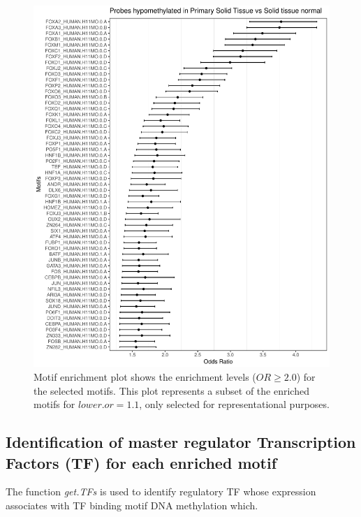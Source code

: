 

\begin{figure}[ht!]
\centering
\includegraphics[width=1.0\textwidth]{images/OR_nosummary.pdf}
\caption[Motif enrichment plot]{\label{fig:boxplot2} Motif enrichment plot shows the enrichment levels ($OR\geq2.0$) for the selected motifs. This plot represents a subset of the enriched motifs for $\textit{lower.or}= 1.1$, only selected for representational purposes.}
\end{figure}

\cleardoublepage
\subsection*{Identification of master regulator Transcription Factors (TF) for each enriched motif}
The function \textit{get.TFs} is used to identify regulatory TF whose expression associates with TF binding motif
DNA methylation which.

